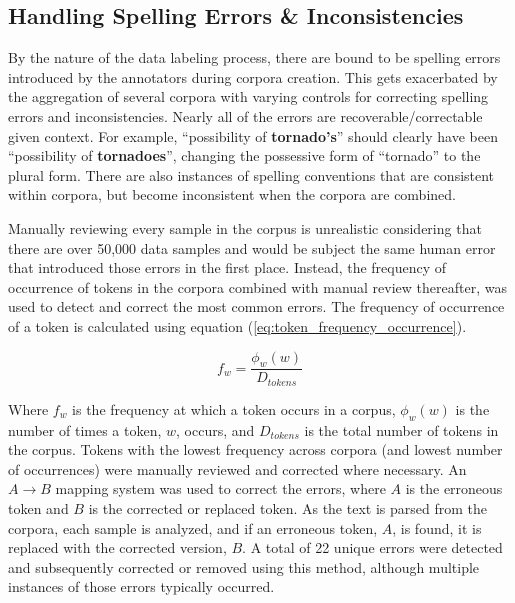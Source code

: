 \documentclass[12pt]{article}
\begin{document}
\subsection{Handling Spelling Errors \& Inconsistencies}\label{sec:spelling_errors}
By the nature of the data labeling process, there are bound to be spelling errors introduced by the annotators during corpora creation. This gets
exacerbated by the aggregation of several corpora with varying controls for correcting spelling errors and inconsistencies. Nearly all of the errors
are recoverable/correctable given context. For example, ``possibility of \textbf{tornado's}'' should clearly have been ``possibility of
\textbf{tornadoes}'', changing the possessive form of ``tornado'' to the plural form. There are also instances of spelling conventions that are
consistent within corpora, but become inconsistent when the corpora are combined.

Manually reviewing every sample in the corpus is unrealistic considering that there are over 50,000 data samples and would be subject the same
human error that introduced those errors in the first place. Instead, the frequency of occurrence of tokens in the corpora combined with manual review
thereafter, was used to detect and correct the most common errors. The frequency of occurrence of a token is calculated using equation
(\ref{eq:token_frequency_occurrence}).

\begin{equation}\label{eq:token_frequency_occurrence}
    f_w = \frac{\phi_w(w)}{D_{tokens}}
\end{equation}

\noindent
Where $f_w$ is the frequency at which a token occurs in a corpus, $\phi_w(w)$ is the number of times a token, $w$, occurs, and $D_{tokens}$ is the
total number of tokens in the corpus. Tokens with the lowest frequency across corpora (and lowest number of occurrences) were manually reviewed and
corrected where necessary. An $A \rightarrow B$ mapping system was used to correct the errors, where \(A\) is the erroneous token and \(B\) is the
corrected or replaced token. As the text is parsed from the corpora, each sample is analyzed, and if an erroneous token, $A$, is found, it is replaced
with the corrected version, $B$. A total of 22 unique errors were detected and subsequently corrected or removed using this method, although multiple
instances of those errors typically occurred.
\end{document}

